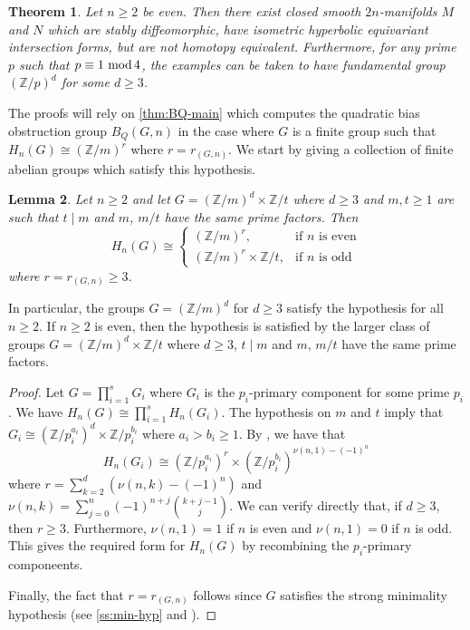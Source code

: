 \documentclass[11pt,a4paper,leqno]{amsart}
\newtheorem{theorem}{Theorem}[section]
\newtheorem{lemma}[theorem]{Lemma}
\theoremstyle{definition}
\theoremstyle{remark}
\newcommand{\Z}{\mathbb{Z}}
\renewcommand{\mod}{\,\,\text{\normalfont mod}\,}
\begin{document}
\begin{theorem} \label{thm:final-examples-eqforms}
Let $n \geq 2$ be even. Then there exist closed smooth $2n$-manifolds $M$ and $N$ which are stably diffeomorphic, have isometric hyperbolic equivariant intersection forms, but are not homotopy equivalent.
Furthermore, for any prime $p$ such that $p \equiv 1 \mod 4$, the examples can be taken to have fundamental group $(\Z/p)^d$ for some $d \ge 3$.
\end{theorem}

The proofs will rely on \cref{thm:BQ-main} which computes the quadratic bias obstruction group $B_Q(G,n)$ in the case where $G$ is a finite group such that $H_n(G) \cong (\Z/m)^r$ where $r=r_{(G,n)}$.
We start by giving a collection of finite abelian groups which satisfy this hypothesis.

\begin{lemma} \label{lemma:H_n(G)}
Let $n \ge 2$ and let $G = (\Z / m)^d \times \Z /t $ where $d \geq 3$ and $m, t \ge 1$ are such that $t \mid m$ and $m$, $m/t$ have the same prime factors.
Then
\[
H_n(G) \cong \begin{cases} (\Z/m)^r, & \text{if $n$ is even} \\
 (\Z/m)^r \times \Z/t, & \text{if $n$ is odd}	
 \end{cases}
\]
where $r = r_{(G,n)} \geq 3$.
\end{lemma}

In particular, the groups $G = (\Z/m)^d$ for $d \ge 3$ satisfy the hypothesis for all $n \ge 2$. If $n \ge 2$ is even, then the hypothesis is satisfied by the larger class of groups $G = (\Z/m)^d \times \Z/t$ where $d \ge 3$, $t \mid m$ and $m$, $m/t$ have the same prime factors.

\begin{proof}
Let $G = \prod_{i=1}^s G_i$ where $G_i$ is the $p_i$-primary component for some prime $p_i$. We have $H_n(G) \cong \prod_{i=1}^s H_n(G_i)$.
The hypothesis on $m$ and $t$ imply that $G_i \cong (\Z/p_i^{a_i})^d \times \Z/p_i^{b_i}$ where $a_i > b_i \ge 1$.
By \cite[Theorem 4.3]{DP17}, we have that
\[ H_n(G_i) \cong (\Z/p_i^{a_i})^r \times (\Z/p_i^{b_i})^{\nu(n,1)-(-1)^n} \]
where $r = \sum_{k = 2}^d (\nu(n,k)-(-1)^n)$ and $\nu(n,k) = \sum_{j=0}^n (-1)^{n+j} \binom{k+j-1}{j}$. We can verify directly that, if $d \ge 3$, then $r \ge 3$. Furthermore, $\nu(n,1) = 1$ if $n$ is even and $\nu(n,1)=0$ if $n$ is odd. This gives the required form for $H_n(G)$ by recombining the $p_i$-primary componeents.

Finally, the fact that $r= r_{(G,n)}$ follows since $G$ satisfies the strong minimality hypothesis (see \cref{ss:min-hyp} and \cite[Proposition 5]{Sieradski:1979}).
\end{proof}
\end{document}

